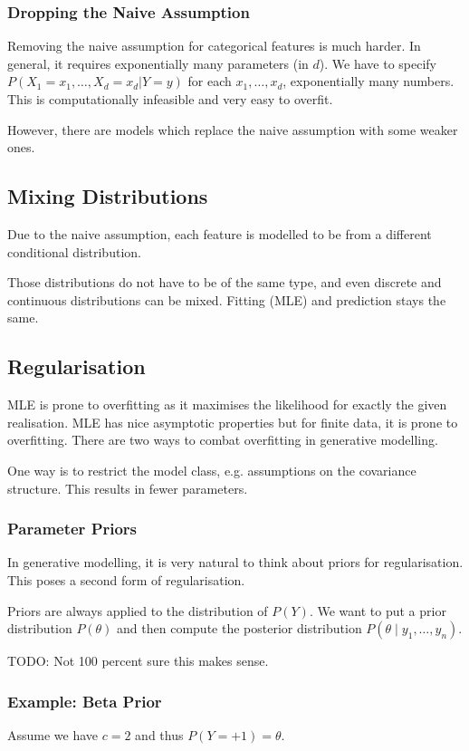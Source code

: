 \subsubsection{Dropping the Naive Assumption}
Removing the naive assumption for
categorical features is much harder.
In general,
it requires exponentially many parameters (in $d$).
We have to specify
$P(X_1 = x_1, \dotsc, X_d = x_d | Y = y)$ for each $x_1, \dotsc, x_d$,
exponentially many numbers.
This is computationally infeasible and very easy to overfit.

However, there are models which replace the naive
assumption with some weaker ones.


\subsection{Mixing Distributions}
Due to the naive assumption,
each feature is modelled to be from a
different conditional distribution.

Those distributions do not have to be
of the same type,
and even discrete and continuous distributions
can be mixed.
Fitting (MLE) and prediction stays the same.


\subsection{Regularisation}
MLE is prone to overfitting as it maximises the likelihood
for exactly the given realisation.
MLE has nice asymptotic properties
but for finite data, it is prone to overfitting.
There are two ways to combat overfitting in
generative modelling.

One way is to restrict the model class,
e.g. assumptions on the covariance structure.
This results in fewer parameters.

\subsubsection{Parameter Priors}
In generative modelling,
it is very natural to think about priors
for regularisation.
This poses a second form of regularisation.

Priors are always applied to the distribution of $P(Y)$.
We want to put a prior distribution $P(\theta)$
and then compute the posterior distribution
$P(\theta \mid y_1, \dotsc, y_n)$.

TODO: Not 100 percent sure this makes sense.

\subsubsection{Example: Beta Prior}
Assume we have $c = 2$ and thus
$P(Y = +1) = \theta$.

